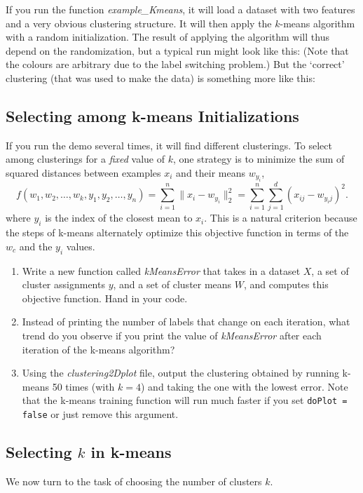 \documentclass{article}
\def\blu#1{{\color{blu}#1}}
\def\norm#1{\|#1\|}
\def\enum#1{\begin{enumerate}#1\end{enumerate}}
\begin{document}
If you run the function \emph{example\_Kmeans}, it will load a dataset with two features and a very obvious clustering structure. It will then apply the $k$-means algorithm with a random initialization. The result of applying the algorithm will thus depend on the randomization, but a typical run might look like this:
(Note that the colours are arbitrary due to the label switching problem.)
But the `correct' clustering (that was used to make the data) is something more like this:

\subsection{Selecting among k-means Initializations}

If you run the demo several times, it will find different clusterings. To select among clusterings for a \emph{fixed} value of $k$, one strategy is to minimize the sum of squared distances between examples $x_i$ and their means $w_{y_i}$,
\[
f(w_1,w_2,\dots,w_k,y_1,y_2,\dots,y_n) = \sum_{i=1}^n \norm{x_i - w_{y_i}}_2^2 = \sum_{i=1}^n \sum_{j=1}^d (x_{ij} - w_{y_ij})^2.
\]
 where $y_i$ is the index of the closest mean to $x_i$. This is a natural criterion because the steps of k-means alternately optimize this objective function in terms of the $w_c$ and the $y_i$ values.
 
 \blu{\enum{
 \item Write a new function called \emph{kMeansError} that takes in a dataset $X$, a set of cluster assignments $y$, and a set of cluster means $W$, and computes this objective function. Hand in your code.
 \item Instead of printing the number of labels that change on each iteration, what trend do you observe if you print the value of \emph{kMeansError} after each iteration of the k-means algorithm?
 \item Using the \emph{clustering2Dplot} file, output the clustering obtained by running k-means 50 times (with $k=4$) and taking the one with the lowest error. Note that the k-means training function will run much faster if you set \texttt{doPlot = false} or just remove this argument.
 }}
 
 \subsection{Selecting $k$ in k-means}
 
 We now turn to the task of choosing the number of clusters $k$.
  
\end{document}
